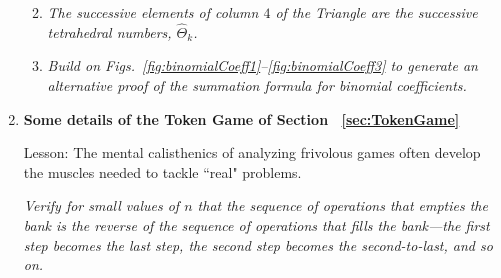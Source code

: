 \begin{enumerate}
\begin{enumerate}
  \medskip\item
{\em The successive elements of column $4$ of the Triangle are the successive tetrahedral numbers, $\widehat{\Theta}_k$.}
  
  \medskip\item
{\em Build on Figs.~\ref{fig:binomialCoeff1}--\ref{fig:binomialCoeff3} to generate an alternative proof of the summation formula for binomial coefficients.}
  \end{enumerate}

\medskip\item
{\bf Some details of the Token Game of Section ~\ref{sec:TokenGame}}

{\sc Lesson:}  The mental calisthenics of analyzing frivolous games often develop the muscles needed to tackle ``real" problems.

\smallskip

{\em Verify for small values of $n$ that the sequence of operations that empties the bank is the reverse of the sequence of operations that fills the bank---the first step becomes the last step, the second step becomes the second-to-last, and so on.}
\end{enumerate}


